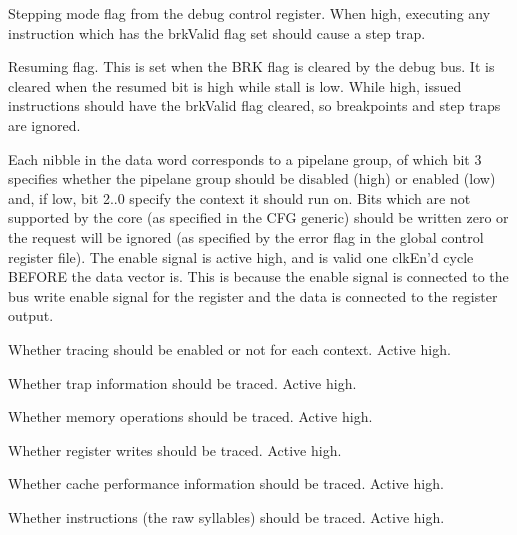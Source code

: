 \ifaceSubGroup{}
Stepping mode flag from the debug control register. When high, executing any 
instruction which has the brkValid flag set should cause a step trap.

\ifaceSubGroup{}
Resuming flag. This is set when the BRK flag is cleared by the debug bus. It is 
cleared when the resumed bit is high while stall is low. While high, issued 
instructions should have the brkValid flag cleared, so breakpoints and step 
traps are ignored.
    
\ifaceSubGroup{}
Each nibble in the data word corresponds to a pipelane group, of which bit 3 
specifies whether the pipelane group should be disabled (high) or enabled (low) 
and, if low, bit 2..0 specify the context it should run on. Bits which are not 
supported by the core (as specified in the CFG generic) should be written zero 
or the request will be ignored (as specified by the error flag in the global 
control register file). The enable signal is active high, and is valid one 
clkEn'd cycle BEFORE the data vector is. This is because the enable signal is 
connected to the bus write enable signal for the register and the data is 
connected to the register output.

\ifaceSubGroup{}
Whether tracing should be enabled or not for each context. Active high.
    
\ifaceSubGroup{}
Whether trap information should be traced. Active high.
    
\ifaceSubGroup{}
Whether memory operations should be traced. Active high.
    
\ifaceSubGroup{}
Whether register writes should be traced. Active high.
    
\ifaceSubGroup{}
Whether cache performance information should be traced. Active high.
    
\ifaceSubGroup{}
Whether instructions (the raw syllables) should be traced. Active high.
